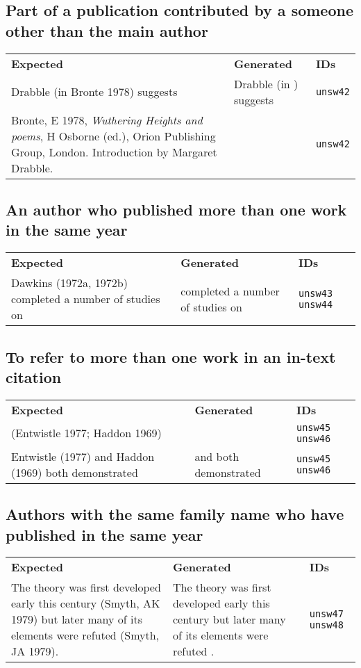 \documentclass[a4paper,landscape,12pt]{article}
\newlength\q
\newlength\qr
\newenvironment{citetable}
  {\noindent\begin{longtable}{p{\q} p{\q} p{\qr}}\textbf{Expected} & \textbf{Generated} & \textbf{IDs}\\}
  {\end{longtable}}
\newcommand{\minorissue}[1]{\textcolor{blue}{#1}}
\begin{document}
\subsection{Part of a publication contributed by a someone other than the main author}

\begin{citetable}
	Drabble (in Bronte 1978) suggests & Drabble (in \cite{unsw42}) suggests & \texttt{unsw42} \\
	Bronte, E 1978, \textit{Wuthering Heights and poems}, H Osborne (ed.), Orion Publishing Group, London. Introduction by Margaret Drabble. & \minorissue{\fullcite{unsw42}} & \texttt{unsw42} \\
\end{citetable}

\subsection{An author who published more than one work in the same year}

\begin{citetable}
	Dawkins (1972a, 1972b) completed a number of studies on & \textcite{unsw43,unsw44} completed a number of studies on & \texttt{unsw43} \texttt{unsw44} \\
\end{citetable}

\subsection{To refer to more than one work in an in-text citation}

\begin{citetable}
	(Entwistle 1977; Haddon 1969) & \parencite{unsw45,unsw46} & \texttt{unsw45} \texttt{unsw46} \\
	Entwistle (1977) and Haddon (1969) both demonstrated & \textcite{unsw45} and \textcite{unsw46} both demonstrated & \texttt{unsw45} \texttt{unsw46} \\
\end{citetable}

\subsection{Authors with the same family name who have published in the same year}

\begin{citetable}
	The theory was first developed early this century (Smyth, AK 1979) but later many of its elements were refuted (Smyth, JA 1979). & The theory was first developed early this century \parencite{unsw47} but later many of its elements were refuted \parencite{unsw48}. & \texttt{unsw47} \texttt{unsw48} \\
\end{citetable}
\end{document}
